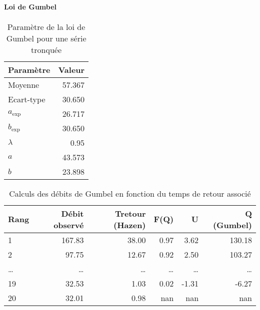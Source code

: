 \paragraph{Loi de Gumbel}
\begin{table}[H]
    \centering
    \begin{tabular}{l|r}
        \toprule
        \textbf{Paramètre} & \textbf{Valeur} \\
        \midrule
        Moyenne            & 57.367          \\
        Ecart-type         & 30.650          \\
        \midrule
        $a_\text{exp}$     & 26.717          \\
        $b_\text{exp}$     & 30.650          \\
        \midrule
        $\lambda$          & 0.95            \\
        $a$                & 43.573          \\
        $b$                & 23.898          \\
        \bottomrule
    \end{tabular}
    \caption{Paramètre de la loi de Gumbel pour une série tronquée}
    \label{tab:param_Gumbel_tronquees2}
\end{table}

\begin{table}[H]
    \centering
    \begin{tabular}{l|r|r|r|r|r}
        \toprule
        \textbf{Rang} & \textbf{Débit observé} & \textbf{Tretour (Hazen)} & \textbf{F(Q)} & \textbf{U} & \textbf{Q (Gumbel)} \\
        \midrule
        1             & 167.83                 & 38.00                    & 0.97          & 3.62       & 130.18              \\
        2             & 97.75                  & 12.67                    & 0.92          & 2.50       & 103.27              \\
        \dots         & \dots                  & \dots                    & \dots         & \dots      & \dots               \\
        19            & 32.53                  & 1.03                     & 0.02          & -1.31      & -6.27               \\
        20            & 32.01                  & 0.98                     & nan           & nan        & nan                 \\
        \bottomrule
    \end{tabular}
    \caption{Calculs des débits de Gumbel en fonction du temps de retour associé}
    \label{tab:gumbelcalcul_tronquees}
\end{table}

